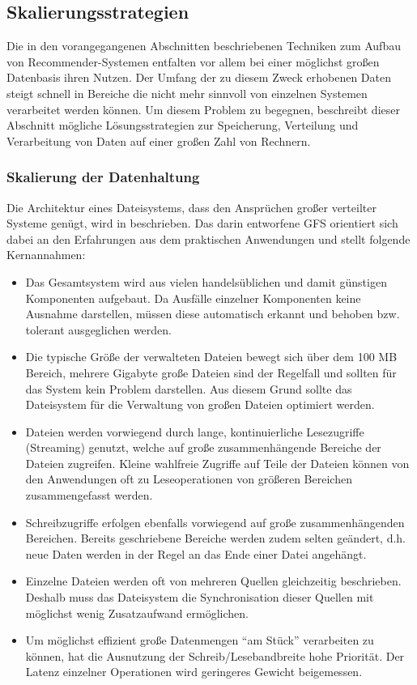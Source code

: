 \subsection{Skalierungsstrategien}
\label{sec:scale}

Die in den vorangegangenen Abschnitten beschriebenen Techniken zum Aufbau von Recommender-Systemen entfalten vor allem bei einer möglichst großen Datenbasis ihren Nutzen. Der Umfang der zu diesem Zweck erhobenen Daten steigt schnell in Bereiche die nicht mehr sinnvoll von einzelnen Systemen verarbeitet werden können.  Um  diesem Problem zu begegnen, beschreibt dieser Abschnitt mögliche Lösungsstrategien zur Speicherung, Verteilung und Verarbeitung von Daten auf einer großen Zahl von Rechnern. 

\subsubsection{Skalierung der Datenhaltung}\label{sec:hfs}

Die Architektur eines Dateisystems, dass den Ansprüchen großer verteilter Systeme genügt, wird in \citep{ghemawat03} beschrieben. Das darin entworfene \acf{GFS} orientiert sich dabei an den Erfahrungen aus dem praktischen Anwendungen und stellt folgende Kernannahmen:

\begin{itemize}
\item Das Gesamtsystem wird aus vielen handelsüblichen und damit günstigen Komponenten aufgebaut. Da Ausfälle einzelner Komponenten keine Ausnahme darstellen, müssen diese automatisch erkannt und behoben bzw. tolerant ausgeglichen werden.
\item Die typische Größe der verwalteten Dateien bewegt sich über dem 100 MB Bereich, mehrere Gigabyte große Dateien sind der Regelfall und sollten für das System kein Problem darstellen. Aus diesem Grund sollte das Dateisystem für die Verwaltung von großen Dateien optimiert werden. 
\item Dateien werden vorwiegend durch lange, kontinuierliche Lesezugriffe (Streaming) genutzt, welche auf große zusammenhängende Bereiche der Dateien zugreifen. Kleine wahlfreie Zugriffe auf Teile der Dateien können von den Anwendungen oft zu Leseoperationen von größeren Bereichen zusammengefasst werden.
\item Schreibzugriffe erfolgen ebenfalls vorwiegend auf große zusammenhängenden Bereichen. Bereits geschriebene Bereiche werden zudem selten geändert, d.h. neue Daten werden in der Regel an das Ende einer Datei angehängt.
\item Einzelne Dateien werden oft von mehreren Quellen gleichzeitig beschrieben. Deshalb muss das Dateisystem die Synchronisation dieser Quellen mit möglichst wenig Zusatzaufwand ermöglichen.
\item Um möglichst effizient große Datenmengen ``am Stück'' verarbeiten zu können, hat die Ausnutzung der Schreib/Lesebandbreite hohe Priorität. Der Latenz einzelner Operationen wird geringeres Gewicht beigemessen.
\end{itemize}


